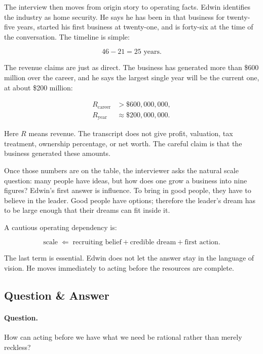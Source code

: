 The interview then moves from origin story to operating facts. Edwin identifies the industry as home security. He says he has been in that business for twenty-five years, started his first business at twenty-one, and is forty-six at the time of the conversation. The timeline is simple:

\begin{equation}
46-21=25\text{ years}.
\end{equation}

The revenue claims are just as direct. The business has generated more than \$600 million over the career, and he says the largest single year will be the current one, at about \$200 million:

\begin{align}
R_{\text{career}} &> \$600{,}000{,}000,\\
R_{\text{year}} &\approx \$200{,}000{,}000.
\end{align}

Here \(R\) means revenue. The transcript does not give profit, valuation, tax treatment, ownership percentage, or net worth. The careful claim is that the business generated these amounts.

Once those numbers are on the table, the interviewer asks the natural scale question: many people have ideas, but how does one grow a business into nine figures? Edwin's first answer is influence. To bring in good people, they have to believe in the leader. Good people have options; therefore the leader's dream has to be large enough that their dreams can fit inside it.

A cautious operating dependency is:

\begin{equation}
\text{scale}
\;\Longleftarrow\;
\text{recruiting belief}
+
\text{credible dream}
+
\text{first action}.
\end{equation}

The last term is essential. Edwin does not let the answer stay in the language of vision. He moves immediately to acting before the resources are complete.

\subsection{Question \& Answer}

\paragraph{Question.}
How can acting before we have what we need be rational rather than merely reckless?

